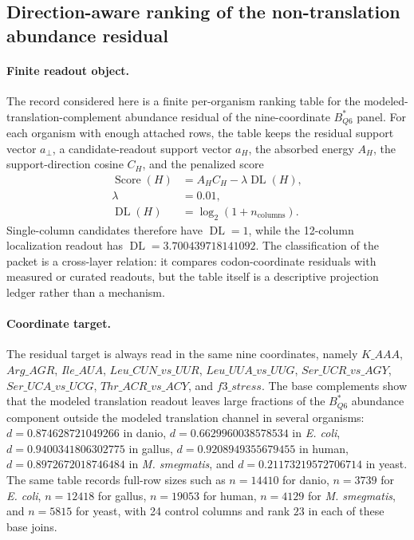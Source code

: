 \subsection{Direction-aware ranking of the non-translation abundance residual}
\label{sec:q6-h-ranking-table-direction-aware-cross-layer}

\paragraph{Finite readout object.}
The record considered here is a finite per-organism ranking table for the modeled-translation-complement abundance residual of the nine-coordinate $B^*_{Q6}$ panel.  For each organism with enough attached rows, the table keeps the residual support vector $a_\perp$, a candidate-readout support vector $a_H$, the absorbed energy $A_H$, the support-direction cosine $C_H$, and the penalized score
$$
\begin{aligned}
  \operatorname{Score}(H) &= A_H C_H - \lambda\operatorname{DL}(H),\\
  \lambda &= 0.01,\\
  \operatorname{DL}(H) &= \log_2(1+n_{\mathrm{columns}}).
\end{aligned}
$$
Single-column candidates therefore have $\operatorname{DL}=1$, while the 12-column localization readout has $\operatorname{DL}=3.700439718141092$.  The classification of the packet is a cross-layer relation: it compares codon-coordinate residuals with measured or curated readouts, but the table itself is a descriptive projection ledger rather than a mechanism.

\paragraph{Coordinate target.}
The residual target is always read in the same nine coordinates, namely $K\_AAA$, $Arg\_AGR$, $Ile\_AUA$, $Leu\_CUN\_vs\_UUR$, $Leu\_UUA\_vs\_UUG$, $Ser\_UCR\_vs\_AGY$, $Ser\_UCA\_vs\_UCG$, $Thr\_ACR\_vs\_ACY$, and $f3\_stress$.  The base complements show that the modeled translation readout leaves large fractions of the $B^*_{Q6}$ abundance component outside the modeled translation channel in several organisms: $d=0.874628721049266$ in danio, $d=0.6629960038578534$ in \emph{E. coli}, $d=0.9400341806302775$ in gallus, $d=0.9208949355679455$ in human, $d=0.8972672018746484$ in \emph{M. smegmatis}, and $d=0.21173219572706714$ in yeast.  The same table records full-row sizes such as $n=14410$ for danio, $n=3739$ for \emph{E. coli}, $n=12418$ for gallus, $n=19053$ for human, $n=4129$ for \emph{M. smegmatis}, and $n=5815$ for yeast, with 24 control columns and rank $23$ in each of these base joins.

